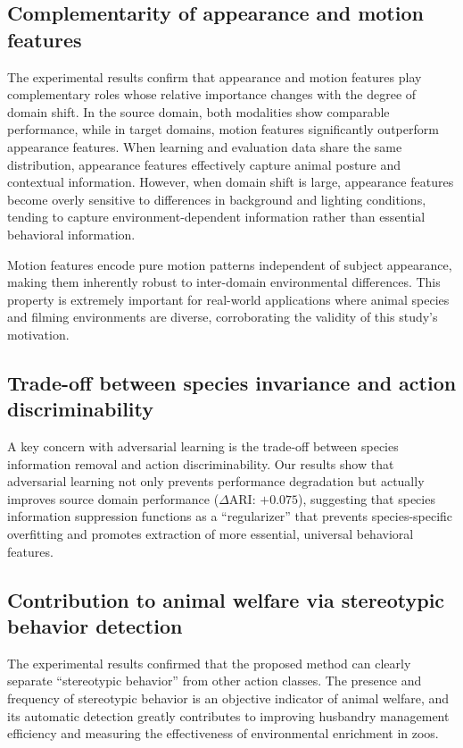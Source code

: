 \documentclass[twocolumn]{svjour3}
\begin{document}
\subsection{Complementarity of appearance and motion features}

The experimental results confirm that appearance and motion features play complementary roles whose relative importance changes with the degree of domain shift.
In the source domain, both modalities show comparable performance, while in target domains, motion features significantly outperform appearance features.
When learning and evaluation data share the same distribution, appearance features effectively capture animal posture and contextual information.
However, when domain shift is large, appearance features become overly sensitive to differences in background and lighting conditions, tending to capture environment-dependent information rather than essential behavioral information.

Motion features encode pure motion patterns independent of subject appearance, making them inherently robust to inter-domain environmental differences.
This property is extremely important for real-world applications where animal species and filming environments are diverse, corroborating the validity of this study's motivation.

\subsection{Trade-off between species invariance and action discriminability}

A key concern with adversarial learning is the trade-off between species information removal and action discriminability.
Our results show that adversarial learning not only prevents performance degradation but actually improves source domain performance ($\Delta$ARI: $+0.075$), suggesting that species information suppression functions as a ``regularizer'' that prevents species-specific overfitting and promotes extraction of more essential, universal behavioral features.

\subsection{Contribution to animal welfare via stereotypic behavior detection}

The experimental results confirmed that the proposed method can clearly separate ``stereotypic behavior'' from other action classes.
The presence and frequency of stereotypic behavior is an objective indicator of animal welfare, and its automatic detection greatly contributes to improving husbandry management efficiency and measuring the effectiveness of environmental enrichment in zoos.
\end{document}
